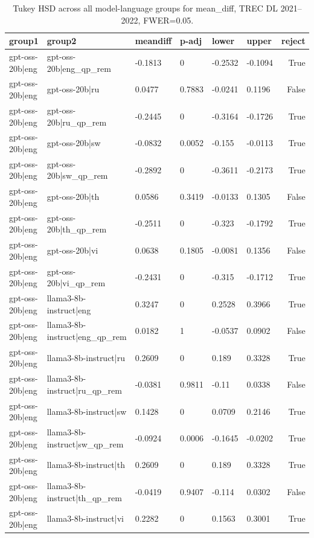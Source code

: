 \begin{table}
\caption{Tukey HSD across all model-language groups for mean_diff, TREC DL 2021--2022, FWER=0.05.}
\label{tab:tukey_all_models_all_langs_2021_2022_mean_diff}
\begin{tabular}{llllllr}
\toprule
group1 & group2 & meandiff & p-adj & lower & upper & reject \\
\midrule
gpt-oss-20b|eng & gpt-oss-20b|eng_qp_rem & -0.1813 & 0 & -0.2532 & -0.1094 & True \\
gpt-oss-20b|eng & gpt-oss-20b|ru & 0.0477 & 0.7883 & -0.0241 & 0.1196 & False \\
gpt-oss-20b|eng & gpt-oss-20b|ru_qp_rem & -0.2445 & 0 & -0.3164 & -0.1726 & True \\
gpt-oss-20b|eng & gpt-oss-20b|sw & -0.0832 & 0.0052 & -0.155 & -0.0113 & True \\
gpt-oss-20b|eng & gpt-oss-20b|sw_qp_rem & -0.2892 & 0 & -0.3611 & -0.2173 & True \\
gpt-oss-20b|eng & gpt-oss-20b|th & 0.0586 & 0.3419 & -0.0133 & 0.1305 & False \\
gpt-oss-20b|eng & gpt-oss-20b|th_qp_rem & -0.2511 & 0 & -0.323 & -0.1792 & True \\
gpt-oss-20b|eng & gpt-oss-20b|vi & 0.0638 & 0.1805 & -0.0081 & 0.1356 & False \\
gpt-oss-20b|eng & gpt-oss-20b|vi_qp_rem & -0.2431 & 0 & -0.315 & -0.1712 & True \\
gpt-oss-20b|eng & llama3-8b-instruct|eng & 0.3247 & 0 & 0.2528 & 0.3966 & True \\
gpt-oss-20b|eng & llama3-8b-instruct|eng_qp_rem & 0.0182 & 1 & -0.0537 & 0.0902 & False \\
gpt-oss-20b|eng & llama3-8b-instruct|ru & 0.2609 & 0 & 0.189 & 0.3328 & True \\
gpt-oss-20b|eng & llama3-8b-instruct|ru_qp_rem & -0.0381 & 0.9811 & -0.11 & 0.0338 & False \\
gpt-oss-20b|eng & llama3-8b-instruct|sw & 0.1428 & 0 & 0.0709 & 0.2146 & True \\
gpt-oss-20b|eng & llama3-8b-instruct|sw_qp_rem & -0.0924 & 0.0006 & -0.1645 & -0.0202 & True \\
gpt-oss-20b|eng & llama3-8b-instruct|th & 0.2609 & 0 & 0.189 & 0.3328 & True \\
gpt-oss-20b|eng & llama3-8b-instruct|th_qp_rem & -0.0419 & 0.9407 & -0.114 & 0.0302 & False \\
gpt-oss-20b|eng & llama3-8b-instruct|vi & 0.2282 & 0 & 0.1563 & 0.3001 & True \\

\end{tabular}
\end{table}
